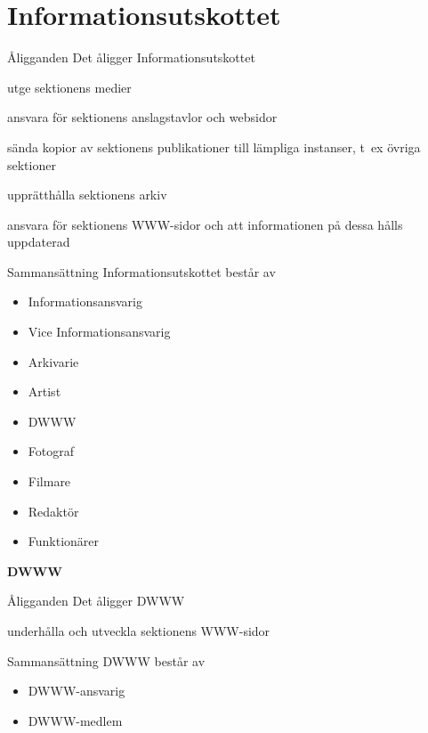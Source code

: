 \documentclass[pdfbookmarks,a4paper,11pt]{article}
\newlength{\itemcollength}
\newenvironment{reglemlista}{%
  \begin{list}{}{%
      \setlength{\labelwidth}{\itemcollength}%
      \setlength{\leftmargin}{\labelwidth + \labelsep}%
      \renewcommand{\makelabel}[1]{%
        \raisebox{0pt}[1ex][0pt]{%
          \makebox[\labelwidth][l]{%
            \parbox[t]{\itemcollength}{%
              \raggedright\hspace{0pt}##1}}}\hfill}%
      }}{%
  \end{list}}
\begin{document}
\section{Informationsutskottet}

\begin{reglemlista}

	\item[Åligganden]
	Det åligger Informationsutskottet
	\begin{attlista}
		\item utge sektionens medier
		\item ansvara för sektionens anslagstavlor och websidor
		\item sända kopior av sektionens publikationer till lämpliga instanser, t~ex övriga sektioner
		\item upprätthålla sektionens arkiv
		\item ansvara för sektionens WWW-sidor och att informationen på dessa hålls uppdaterad
	\end{attlista}

	\item[Sammansättning]
	Informationsutskottet består av
	\begin{itemize}
		\item Informationsansvarig
		\item Vice Informationsansvarig
		\item Arkivarie
		\item Artist
		\item DWWW
		\item Fotograf
		\item Filmare
        \item Redaktör
		\item Funktionärer
	\end{itemize}

	\item[\textbf{DWWW}]

	\item[Åligganden]
	Det åligger DWWW
	\begin{attlista}
		\item underhålla och utveckla sektionens WWW-sidor
	\end{attlista}

	\item[Sammansättning]
	DWWW består av
	\begin{itemize}
		\item DWWW-ansvarig
		\item DWWW-medlem
	\end{itemize}

\end{reglemlista}
\end{document}
